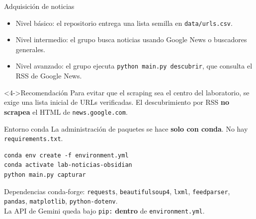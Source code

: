 \documentclass[11pt,aspectratio=169]{beamer}
\newcommand{\code}[1]{\texttt{#1}}
\begin{document}
\begin{frame}{Adquisición de noticias}
\small
\begin{itemize}[<+->]
\item Nivel básico: el repositorio entrega una lista semilla en \code{data/urls.csv}.
\item Nivel intermedio: el grupo busca noticias usando Google News o buscadores generales.
\item Nivel avanzado: el grupo ejecuta \code{python main.py descubrir}, que consulta el RSS de Google News.
\end{itemize}

\begin{block}<4->{Recomendación}
Para evitar que el scraping sea el centro del laboratorio, se exige una lista inicial de URLs verificadas. El descubrimiento por RSS \textbf{no scrapea} el HTML de \code{news.google.com}.
\end{block}
\end{frame}

\begin{frame}[fragile]{Entorno conda}
\small
La administración de paquetes se hace \textbf{solo con conda}. No hay \code{requirements.txt}.

\vspace{0.2cm}
\tiny
\begin{lstlisting}
conda env create -f environment.yml
conda activate lab-noticias-obsidian
python main.py capturar
\end{lstlisting}

\vspace{0.15cm}
\scriptsize
\begin{block}{Dependencias}
conda-forge: \code{requests}, \code{beautifulsoup4}, \code{lxml}, \code{feedparser}, \code{pandas}, \code{matplotlib}, \code{python-dotenv}.\\
La API de Gemini queda bajo \code{pip:} \textbf{dentro} de \code{environment.yml}.
\end{block}
\end{frame}
\end{document}
